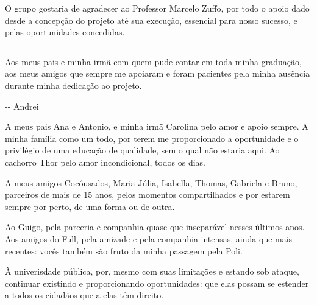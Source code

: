 \documentclass[]{politex}
\begin{document}
\capa
\falsafolhaderosto
\folhaderosto





\begin{agradecimentos}

O grupo gostaria de agradecer ao Professor Marcelo Zuffo, por todo o apoio dado desde a concepção do projeto até sua execução, essencial para nosso sucesso, e pelas oportunidades concedidas.

\begin{center}
    \noindent\rule{2cm}{0.4pt}
\end{center}

Aos meus pais e minha irmã com quem pude contar em toda minha graduação, aos meus amigos que sempre me apoiaram e foram pacientes pela minha ausência durante minha dedicação ao projeto.

\begin{flushright}
	-{}- Andrei
\end{flushright}

A meus pais Ana e Antonio, e minha irmã Carolina pelo amor e apoio sempre. A minha família como um todo, por terem me proporcionado a oportunidade e o privilégio de uma educação de qualidade, sem o qual não estaria aqui. Ao cachorro Thor pelo amor incondicional, todos os dias.

A meus amigos Cocóusados, Maria Júlia, Isabella, Thomas, Gabriela e Bruno, parceiros de mais de 15 anos, pelos momentos compartilhados e por estarem sempre por perto, de uma forma ou de outra.

Ao Guigo, pela parceria e companhia quase que inseparável nesses últimos anos. Aos amigos do Full, pela amizade e pela companhia intensas, ainda que mais recentes: vocês também são fruto da minha passagem pela Poli.

À univerisdade pública, por, mesmo com suas limitações e estando sob ataque, continuar existindo e proporcionando oportunidades: que elas possam se estender a todos os cidadãos que a elas têm direito.


\end{agradecimentos}
\end{document}
